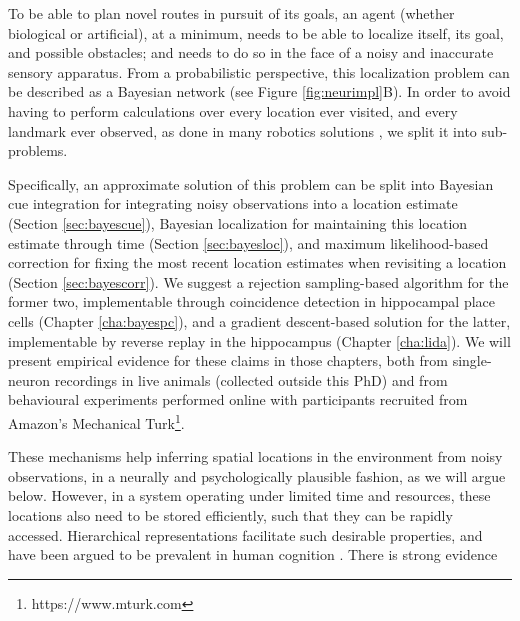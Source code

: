 To be able to plan novel routes in pursuit of its goals, an agent (whether biological or artificial), at a minimum, needs to be able to localize itself, its goal, and possible obstacles; and needs to do so in the face of a noisy and inaccurate sensory apparatus. From a probabilistic perspective, this localization problem can be described as a Bayesian network (see Figure \ref{fig:neurimpl}B). In order to avoid having to perform calculations over every location ever visited, and every landmark ever observed, as done in many robotics solutions \citep{durrant2006simultaneous,bailey2006simultaneous}, we split it into sub-problems. 

Specifically, an approximate solution of this problem can be split into Bayesian cue integration for integrating noisy observations into a location estimate (Section \ref{sec:bayescue}), Bayesian localization for maintaining this location estimate through time (Section \ref{sec:bayesloc}), and maximum likelihood-based correction for fixing the most recent location estimates when revisiting a location (Section \ref{sec:bayescorr}). We suggest a rejection sampling-based algorithm for the former two, implementable through coincidence detection in hippocampal place cells (Chapter \ref{cha:bayespc}), and a gradient descent-based solution for the latter, implementable by reverse replay in the hippocampus (Chapter \ref{cha:lida}). We will present empirical evidence for these claims in those chapters, both from single-neuron recordings in live animals (collected outside this PhD) and from behavioural experiments performed online with participants recruited from Amazon's Mechanical Turk\footnote{https://www.mturk.com}.

These mechanisms help inferring spatial locations in the environment from noisy observations, in a neurally and psychologically plausible fashion, as we will argue below. However, in a system operating under limited time and resources, these locations also need to be stored efficiently, such that they can be rapidly accessed. Hierarchical representations facilitate such desirable properties, and have been argued to be prevalent in human cognition \citep{cohen2000hierarchical, gobet2001chunking}. There is strong evidence

\nocite{deshmukh2013}

